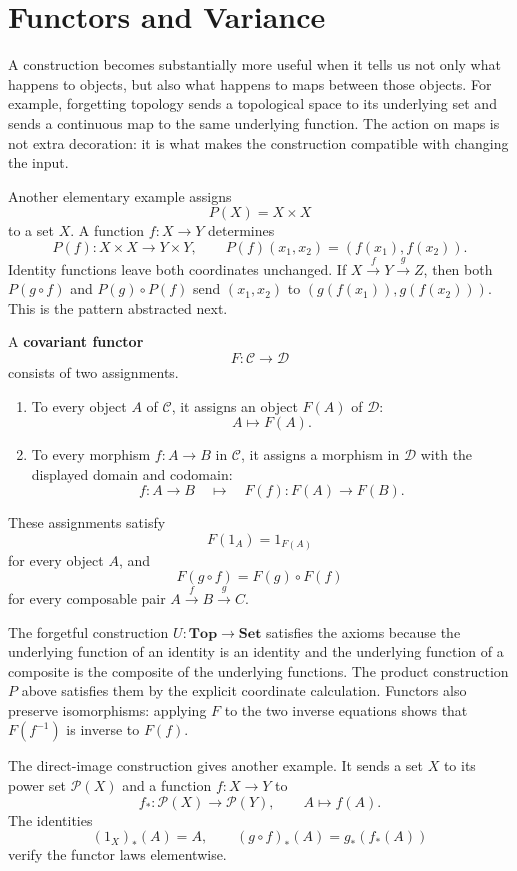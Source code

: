 \section{Functors and Variance}
A construction becomes substantially more useful when it tells us not only
what happens to objects, but also what happens to maps between those objects.
For example, forgetting topology sends a topological space to its underlying
set and sends a continuous map to the same underlying function. The action on
maps is not extra decoration: it is what makes the construction compatible
with changing the input.

Another elementary example assigns
\[
P(X)=X\times X
\]
to a set $X$. A function $f:X\to Y$ determines
\[
P(f):X\times X\longrightarrow Y\times Y,
\qquad
P(f)(x_1,x_2)=(f(x_1),f(x_2)).
\]
Identity functions leave both coordinates unchanged. If
$X\xrightarrow{f}Y\xrightarrow{g}Z$, then both $P(g\circ f)$ and
$P(g)\circ P(f)$ send $(x_1,x_2)$ to
$(g(f(x_1)),g(f(x_2)))$. This is the pattern abstracted next.

\begin{definition}\label{def:functor}
A \textbf{covariant functor}
\[
F:\mathcal C\longrightarrow\mathcal D
\]
consists of two assignments.
\begin{enumerate}[label=\arabic*.,leftmargin=*]
\item To every object $A$ of $\mathcal C$, it assigns an object $F(A)$ of
$\mathcal D$:
\[
A\longmapsto F(A).
\]
\item To every morphism $f:A\to B$ in $\mathcal C$, it assigns a morphism
in $\mathcal D$ with the displayed domain and codomain:
\[
f:A\to B
\quad\longmapsto\quad
F(f):F(A)\to F(B).
\]
\end{enumerate}
These assignments satisfy
\[
F(1_A)=1_{F(A)}
\]
for every object $A$, and
\[
F(g\circ f)=F(g)\circ F(f)
\]
for every composable pair $A\xrightarrow{f}B\xrightarrow{g}C$.
\end{definition}

The forgetful construction $U:\mathbf{Top}\to\mathbf{Set}$ satisfies the
axioms because the underlying function of an identity is an identity and the
underlying function of a composite is the composite of the underlying
functions. The product construction $P$ above satisfies them by the explicit
coordinate calculation. Functors also preserve isomorphisms: applying $F$ to
the two inverse equations shows that $F(f^{-1})$ is inverse to $F(f)$.

The direct-image construction gives another example. It sends a set $X$ to
its power set $\mathcal P(X)$ and a function $f:X\to Y$ to
\[
f_*:\mathcal P(X)\longrightarrow\mathcal P(Y),
\qquad
A\longmapsto f(A).
\]
The identities
\[
(1_X)_*(A)=A,
\qquad
(g\circ f)_*(A)=g_*(f_*(A))
\]
verify the functor laws elementwise.

